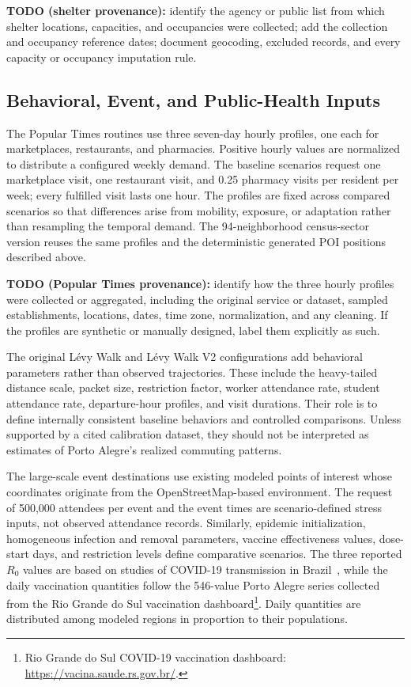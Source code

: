 {\color{red}\textbf{TODO (shelter provenance):} identify the agency or public list from which shelter locations, capacities, and occupancies were collected; add the collection and occupancy reference dates; document geocoding, excluded records, and every capacity or occupancy imputation rule.}

\subsection{Behavioral, Event, and Public-Health Inputs}
\label{sec:behavioral_policy_input_data}

The Popular Times routines use three seven-day hourly profiles, one each for marketplaces, restaurants, and pharmacies. Positive hourly values are normalized to distribute a configured weekly demand. The baseline scenarios request one marketplace visit, one restaurant visit, and 0.25 pharmacy visits per resident per week; every fulfilled visit lasts one hour. The profiles are fixed across compared scenarios so that differences arise from mobility, exposure, or adaptation rather than resampling the temporal demand. The 94-neighborhood census-sector version reuses the same profiles and the deterministic generated POI positions described above.

{\color{red}\textbf{TODO (Popular Times provenance):} identify how the three hourly profiles were collected or aggregated, including the original service or dataset, sampled establishments, locations, dates, time zone, normalization, and any cleaning. If the profiles are synthetic or manually designed, label them explicitly as such.}

The original L\'evy Walk and L\'evy Walk V2 configurations add behavioral parameters rather than observed trajectories. These include the heavy-tailed distance scale, packet size, restriction factor, worker attendance rate, student attendance rate, departure-hour profiles, and visit durations. Their role is to define internally consistent baseline behaviors and controlled comparisons. Unless supported by a cited calibration dataset, they should not be interpreted as estimates of Porto Alegre's realized commuting patterns.

The large-scale event destinations use existing modeled points of interest whose coordinates originate from the OpenStreetMap-based environment. The request of 500,000 attendees per event and the event times are scenario-defined stress inputs, not observed attendance records. Similarly, epidemic initialization, homogeneous infection and removal parameters, vaccine effectiveness values, dose-start days, and restriction levels define comparative scenarios. The three reported $R_0$ values are based on studies of COVID-19 transmission in Brazil~\citep{dutra2020covidR0,deSouza2020covirR0,dutra2021covidR0}, while the daily vaccination quantities follow the 546-value Porto Alegre series collected from the Rio Grande do Sul vaccination dashboard\footnote{Rio Grande do Sul COVID-19 vaccination dashboard: \url{https://vacina.saude.rs.gov.br/}.}. Daily quantities are distributed among modeled regions in proportion to their populations.

